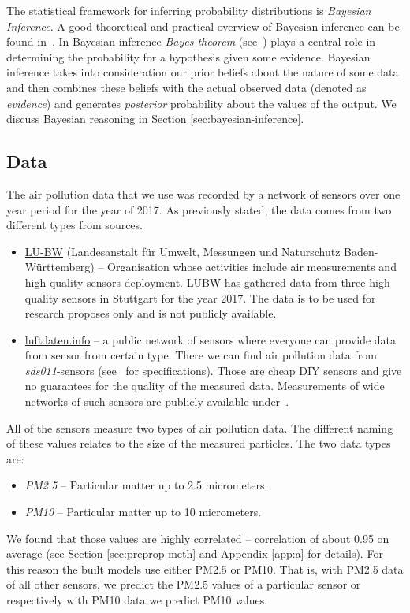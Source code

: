 \documentclass[12pt,a4paper,twoside]{scrartcl}
\numberwithin{equation}{section}
\newcommand{\refsec}[1]{\hyperref[#1]{Section \ref*{#1}}}
\newcommand{\refapp}[1]{\hyperref[#1]{Appendix \ref*{#1}}}
\begin{document}
The statistical framework for inferring probability distributions is \emph{Bayesian Inference}. A good theoretical and practical overview of Bayesian inference can be found in~\cite{tipping2004}. In Bayesian inference \emph{Bayes theorem} (see~\cite{bayes63}) plays a central role in determining the probability for a hypothesis given some evidence. Bayesian inference takes into consideration our prior beliefs about the nature of some data and then combines these beliefs with the actual observed data (denoted as \emph{evidence}) and generates \emph{posterior} probability about the values of the output. We discuss Bayesian reasoning in \refsec{sec:bayesian-inference}.
\subsection{Data}\label{sec:data}
The air pollution data that we use was recorded by a network of sensors over one year period for the year of 2017. As previously stated, the data comes from two different types from sources.
\begin{itemize}
\item \href{https://www.lubw.baden-wuerttemberg.de/startseite}{LU-BW} (Landesanstalt für Umwelt, Messungen und Naturschutz Baden-Württemberg) -- Organisation whose activities include air measurements and high quality sensors deployment. LUBW has gathered data from three high quality sensors in Stuttgart for the year 2017. The data is to be used for research proposes only and is not publicly available.
\item \href{https://luftdaten.info/}{luftdaten.info} -- a public network of sensors where everyone can provide data from sensor from certain type. There we can find air pollution data from \emph{sds011}-sensors (see~\cite{sds011}  for specifications). Those are cheap DIY sensors and give no guarantees for the quality of the measured data. Measurements of wide networks of such sensors are publicly available under~\cite{luftdaten}.
\end{itemize}
All of the sensors measure two types of air pollution data. The different naming of these values relates to the size of the measured particles. The two data types are:
\begin{itemize}
\item \emph{PM2.5} -- Particular matter up to 2.5 micrometers.
\item \emph{PM10} -- Particular matter up to 10 micrometers.
\end{itemize}
We found that those values are highly correlated -- correlation of about 0.95 on average (see \refsec{sec:preprop-meth} and \refapp{app:a} for details). For this reason the built models use either PM2.5 or PM10. That is, with PM2.5 data of all other sensors, we predict the PM2.5 values of a particular sensor or respectively with PM10 data we predict PM10 values.
\end{document}
